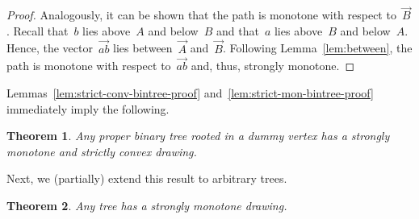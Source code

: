 \documentclass[a4paper,11pt]{article}
\theoremstyle{plain}
\newtheorem{theorem}{Theorem}
\begin{document}
\begin{proof}
    Analogously, it can be shown that the path is monotone with respect 
    to~$\vec B$. Recall that~$b$ lies above~$A$ and below~$B$ and 
    that~$a$ lies above~$B$ and below~$A$.  Hence, the 
    vector~$\overrightarrow{ab}$ lies between~$\vec A$ and~$\vec B$. Following 
    Lemma~\ref{lem:between}, the path is monotone with respect 
    to~$\overrightarrow{ab}$ and, thus, strongly monotone.
\end{proof}

Lemmas~\ref{lem:strict-conv-bintree-proof} 
and~\ref{lem:strict-mon-bintree-proof} immediately imply the following.

\begin{theorem}\label{thm:strict-mon-bintree-proof}
  Any proper binary tree rooted in a dummy vertex
  has a strongly monotone and strictly convex drawing.
\end{theorem}

Next, we (partially) extend this result to arbitrary trees.

\begin{theorem}\label{thm:strict-mon-tree-proof}
  Any tree has a strongly monotone drawing.
\end{theorem}
\end{document}
